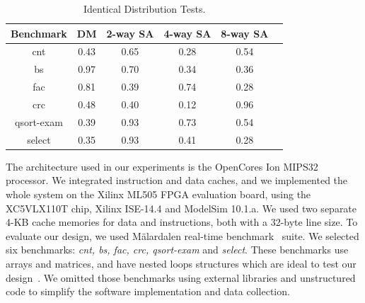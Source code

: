 \begin{table}
\center
\caption{Identical Distribution Tests.}

\label{id test}

\begin{tabular}{|c | c| c | c| c| c |} 
 \hline
Benchmark & DM & 2-way SA & 4-way SA & 8-way SA  \\ 
\hline

 
 
 cnt & 0.43 &0.65 & 0.28&0.54  \\
 \hline
 bs & 0.97 & 0.70&0.34 &0.36 \\ 
 \hline
 
 fac & 0.81 & 0.39 &0.74 &0.28 \\
 \hline
 crc & 0.48 & 0.40 & 0.12&0.96 \\
 \hline
 qsort-exam & 0.39  &0.93 &0.73  &0.54 \\
 \hline
 select & 0.35 &0.93 &0.41 &0.28 \\
 \hline
 
 
\end{tabular}
\end{table}



The architecture used in our experiments is the OpenCores Ion MIPS32
processor. We integrated instruction and data caches, and we
implemented the whole system on the Xilinx ML505 FPGA evaluation
board, using the XC5VLX110T chip,  Xilinx ISE-14.4 and ModelSim 10.1.a. We used two separate 4-KB cache
memories for data and instructions, both with a 32-byte line size.  To
evaluate our design, we used M\"alardalen real-time benchmark~\cite{mrtc:bench} suite. We selected six benchmarks: \textit{cnt, bs,
  fac, crc, qsort-exam} and \textit{select}. These benchmarks use arrays
and matrices, and have nested loops structures which are ideal to test
our design~\cite{Competitive}. We omitted those benchmarks using
external libraries and unstructured code to simplify the
software implementation and data collection. 



